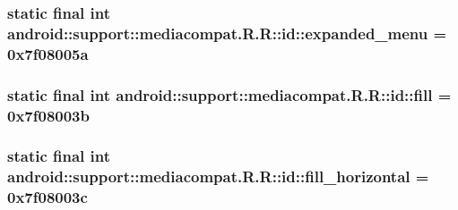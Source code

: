 \hypertarget{classandroid_1_1support_1_1mediacompat_1_1_r_1_1id_6189e674e3de017a6c194141db888043}{
\subsubsection[{expanded\_\-menu}]{\setlength{\rightskip}{0pt plus 5cm}static final int android::support::mediacompat.R.R::id::expanded\_\-menu = 0x7f08005a}}
\label{classandroid_1_1support_1_1mediacompat_1_1_r_1_1id_6189e674e3de017a6c194141db888043}


\hypertarget{classandroid_1_1support_1_1mediacompat_1_1_r_1_1id_115810444e7bca9f48026f13480ee6af}{
\subsubsection[{fill}]{\setlength{\rightskip}{0pt plus 5cm}static final int android::support::mediacompat.R.R::id::fill = 0x7f08003b}}
\label{classandroid_1_1support_1_1mediacompat_1_1_r_1_1id_115810444e7bca9f48026f13480ee6af}


\hypertarget{classandroid_1_1support_1_1mediacompat_1_1_r_1_1id_a49a0d924c3cb41670b27e7d022609ba}{
\subsubsection[{fill\_\-horizontal}]{\setlength{\rightskip}{0pt plus 5cm}static final int android::support::mediacompat.R.R::id::fill\_\-horizontal = 0x7f08003c}}
\label{classandroid_1_1support_1_1mediacompat_1_1_r_1_1id_a49a0d924c3cb41670b27e7d022609ba}


